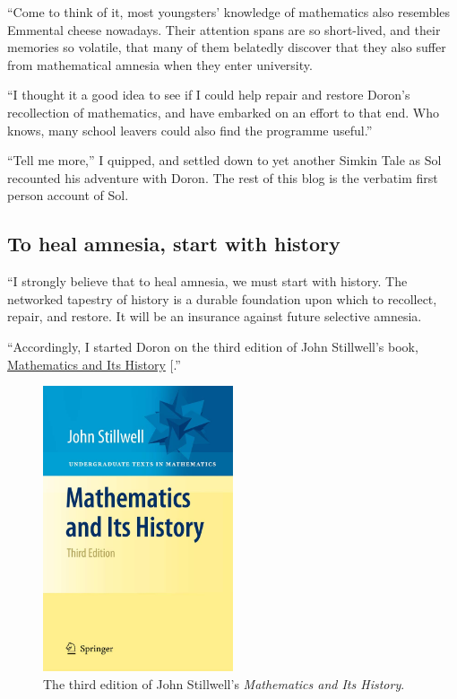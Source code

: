 \documentclass[
  a4paper,
]{article}
\begin{document}
``Come to think of it, most youngsters' knowledge of mathematics also
resembles Emmental cheese nowadays. Their attention spans are so
short-lived, and their memories so volatile, that many of them belatedly
discover that they also suffer from mathematical amnesia when they enter
university.

``I thought it a good idea to see if I could help repair and restore
Doron's recollection of mathematics, and have embarked on an effort to
that end. Who knows, many school leavers could also find the programme
useful.''

``Tell me more,'' I quipped, and settled down to yet another Simkin Tale
as Sol recounted his adventure with Doron. The rest of this blog is the
verbatim first person account of Sol.

\subsection{To heal amnesia, start with
history}\label{to-heal-amnesia-start-with-history}

``I strongly believe that to heal amnesia, we must start with history.
The networked tapestry of history is a durable foundation upon which to
recollect, repair, and restore. It will be an insurance against future
selective amnesia.

``Accordingly, I started Doron on the third edition of John Stillwell's
book,
\href{https://www.amazon.in/Mathematics-Its-History-Undergraduate-Texts/dp/144196052X}{Mathematics
and Its History} {[}\citeproc{ref-stillwell2010}{1}{]}.''

\begin{figure}
\centering
\includegraphics[width=0.5\textwidth,height=\textheight]{images/stillwell-history-third.jpg}
\caption{The third edition of John Stillwell's \emph{Mathematics and Its
History}.}\label{fig:stillwell}
\end{figure}
\end{document}
